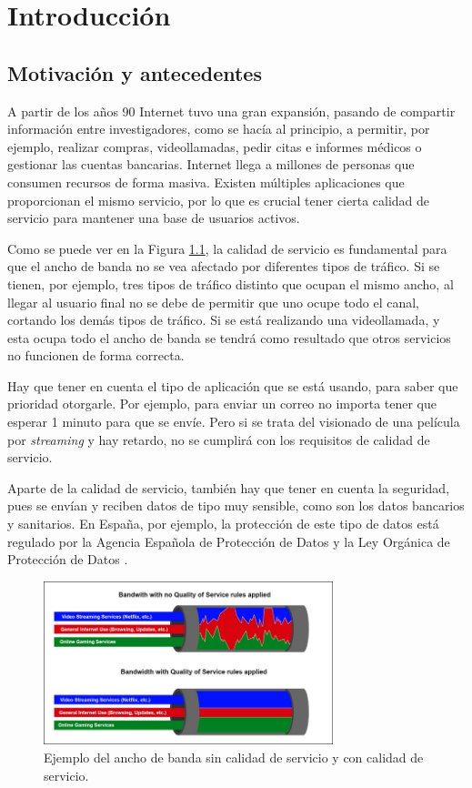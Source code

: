 \chapter{Introducción}\label{introduccion}

\section{Motivación y antecedentes}

A partir de los años 90 Internet tuvo una gran expansión, pasando de compartir información entre investigadores, 
como se hacía al principio, a permitir, por ejemplo, realizar compras, videollamadas, pedir citas e informes médicos o gestionar 
las cuentas bancarias. Internet llega a millones de personas que consumen recursos de forma masiva. 
Existen múltiples aplicaciones que proporcionan el mismo servicio, por lo que es crucial tener cierta calidad de servicio 
\cite{microqos} para mantener una base de usuarios activos.

\intro Como se puede ver en la Figura \ref{Figura 1}, la calidad de servicio es fundamental para que el ancho de banda no se vea 
afectado por diferentes tipos de tráfico. Si se tienen, por ejemplo, tres tipos de tráfico distinto que ocupan el mismo ancho, al 
llegar al usuario final no se debe de permitir que uno ocupe todo el canal, cortando los demás tipos de tráfico. Si se está realizando 
una videollamada, y esta ocupa todo el ancho de banda se tendrá como resultado que otros servicios no funcionen de forma correcta.

\intro Hay que tener en cuenta el tipo de aplicación que se está usando, para saber que prioridad otorgarle. Por ejemplo, para 
enviar un correo no importa tener que esperar 1 minuto para que se envíe. Pero si se trata del visionado de una película por 
\textit{streaming} y hay retardo, no se cumplirá con los requisitos de calidad de servicio.

\intro Aparte de la calidad de servicio, también hay que tener en cuenta la seguridad, pues se envían y reciben 
datos de tipo muy sensible, como son los datos bancarios y sanitarios. En España, por ejemplo, la protección de este tipo de datos está regulado por la Agencia Española de Protección de Datos \cite{aepdindex} y la Ley Orgánica de Protección de Datos \cite{lopdindex}.

\begin{figure}[H]
  \includegraphics[width=0.75\textwidth]{imagenes/calidadservicio.png}
  \centering
  \caption{Ejemplo del ancho de banda sin calidad de servicio y con calidad de servicio.}\label{Figura 1}
\end{figure}

